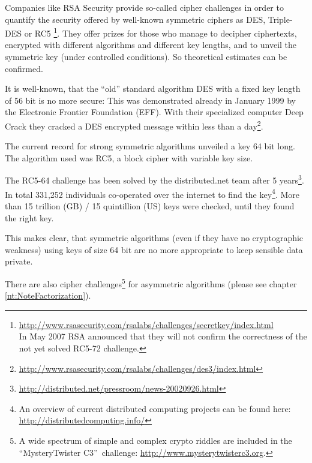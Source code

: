 Companies like RSA Security provide so-called cipher challenges in order
to quantify the security offered by well-known symmetric ciphers as DES,
Triple-DES or RC5%
%
\footnote{%
 \url{http://www.rsasecurity.com/rsalabs/challenges/secretkey/index.html}\\
 In May 2007 RSA announced that they will not confirm the correctness of
 the not yet solved RC5-72 challenge.}.
They offer prizes for those who manage to decipher ciphertexts, encrypted with different algorithms and different key lengths, and to unveil the symmetric key (under controlled conditions). So theoretical estimates can be confirmed.

It is well-known, that the ``old'' standard algorithm DES with a fixed key length
of 56 bit is no more secure: This was demonstrated already in January 1999 by the
Electronic Frontier Foundation (EFF). With their specialized computer Deep Crack
they cracked a DES encrypted message within less than a day\footnote{%
 \url{http://www.rsasecurity.com/rsalabs/challenges/des3/index.html}
}.

The current record for strong symmetric algorithms unveiled a key 64 bit long.
The algorithm used was RC5, a block cipher with variable key size. 

The RC5-64 challenge has been solved by the distributed.net team after 5
years\footnote{%
 \url{http://distributed.net/pressroom/news-20020926.html}
}.
In total 331,252 individuals co-operated over the internet to find the key\footnote{%
An overview of current distributed computing projects can be found here:\\
\url{http://distributedcomputing.info/}
}.
More than 15 trillion (GB) / 15 quintillion (US)  keys were checked, until they
found the right key.

This makes clear, that symmetric algorithms (even if they have no
cryptographic weakness) using keys of size 64 bit are no more appropriate
to keep sensible data private.

There are also cipher challenges\footnote{%
  A wide spectrum of simple and complex crypto riddles are included
  in the ``MysteryTwister C3''~challenge: \url{http://www.mysterytwisterc3.org}.
  }  for asymmetric algorithms (please see chapter \ref{nt:NoteFactorization}).




